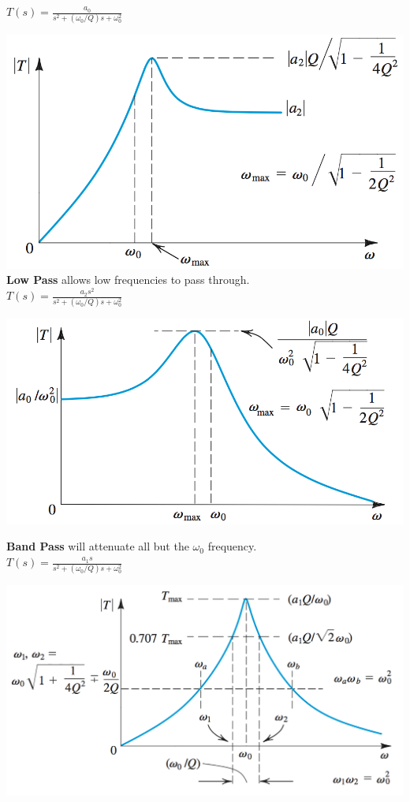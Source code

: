 \documentclass[11pt]{article}
\begin{document}
    $T(s) = \frac{a_0}{s^2 + (\omega_0/Q)s + \omega_{0}^2}$

    \includegraphics[width=\textwidth]{highpass3}
    \\
    
    \textbf{Low Pass} allows low frequencies to pass through. \\

   $T(s) = \frac{a_2s^2}{s^2 + (\omega_0/Q)s + \omega_{0}^2}$

    \includegraphics[width=\textwidth]{lowpass3}    
    
    \textbf{Band Pass} will attenuate all but the $\omega_0$ frequency. \\

    $T(s) = \frac{a_1s}{s^2 + (\omega_0/Q)s + \omega_{0}^2}$

    \includegraphics[width=\textwidth]{bandpass3} 
       
\end{document}
